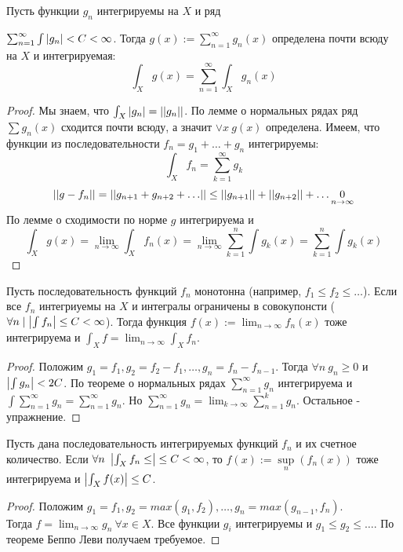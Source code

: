 \begin{theorem*}
    Пусть функции $g_n$ интегрируемы на $X$ и ряд \par $\sum_{n=1}^{\infty} \int \left| g_n \right| < C < \infty$. Тогда $g(x) := \sum_{n=1}^{\infty} g_n(x)$ определена почти всюду на $X$ и интегрируемая:
    \[\int_X g(x) = \sum_{n=1}^{\infty} \int_X g_n(x)\]
    \begin{proof}
        Мы знаем, что $\int_X \left| g_n \right| = \left| \left|  g_n \right| \right|$. По лемме о нормальных рядах ряд $\sum g_n(x)$ сходится почти всюду, а значит $\vee x \ g(x)$ определена. Имеем, что функции из последовательности $f_n = g_1 + \hdots + g_n$ интегрируемы:
        \[\int_X f_n = \sum_{k=1}^{\infty}g_k\]
        \[\left| \left|  g-f_n \right| \right| = \left| \left|  g_{n+1} + g_{n+2} + \hdots  \right| \right| \le \left| \left|  g_{n+1} \right| \right| + \left| \left|  g_{n+2} \right| \right| + \hdots \underset{n \to \infty}{0}\]
        По лемме о сходимости по норме $g$ интегрируема и 
        \[\int_X g(x) = \lim_{n\to \infty} \int_X f_n(x) = \lim_{n\to \infty} \sum_{k=1}^{n} \int g_k(x) = \sum_{k=1}^{n} \int g_k(x)\]
    \end{proof}
\end{theorem*}

\begin{theorem*}
    Пусть последовательность функций $f_n$ монотонна (например, $f_1 \le f_2 \le  \hdots$). Если все $f_n$ интегриуемы на $X$ и интегралы ограничены в совокупонсти ($\forall n \mid \left| \int f_n  \right| \le C < \infty$). 
    Тогда функция $f(x) := \lim_{n \to \infty} f_n(x)$ тоже интегрируема и $\int_X f = \lim_{n\to \infty} \int_X f_n$.
    \begin{proof}
        Положим $g_1 = f_1, g_2 = f_2 - f_1, \hdots, g_n = f_n - f_{n-1}$. Тогда $\forall n \ g_n \ge 0$ и $\left| \int g_n \right| < 2C$. По теореме о нормальных рядах $\sum_{n=1}^{\infty} g_n$ интегрируема и $\int \sum_{n=1}^{\infty}g_n = \sum_{n=1}^{\infty}g_n$. Но $\sum_{n=1}^{\infty} g_n = \lim_{k \to \infty} \sum_{n=1}^{k}g_n$. Остальное - упражнение. 
    \end{proof}
\end{theorem*}

\begin{lemma*}
    Пусть дана последовательность интегрируемых функций $f_n$ и их счетное количество. Если $\forall n \ \abs{\int_{X} f_n \le } \le C < \infty$, то $f(x):=\underset{n}{\sup}(f_n(x))$ тоже интегрируема и $\left| \int_X f(x) \right| \le C$.
    \begin{proof}
        Положим $g_1 = f_1, g_2 = max(g_1, f_2), \hdots, g_n = max(g_{n-1}, f_n)$. \\ Тогда $f = \lim_{n\to \infty} g_n \ \forall x \in X$.
        Все функции $g_i$ интегрируемы и $g_1 \le g_2 \le \hdots$. По теореме Беппо Леви получаем требуемое.
    \end{proof}
\end{lemma*}

